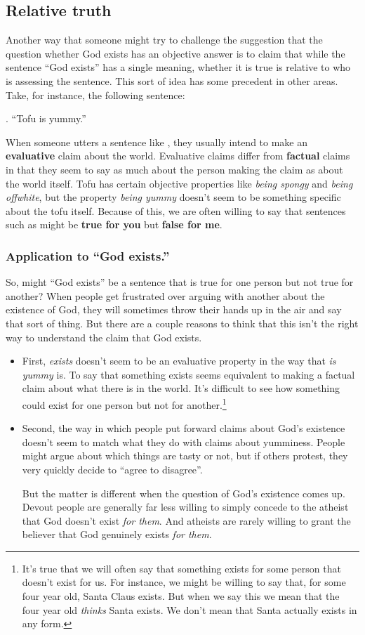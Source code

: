 \documentclass[letterpaper,10pt]{article}
\begin{document}
\subsection{Relative truth}
Another way that someone might try to challenge the suggestion that the question whether God exists has an objective answer is to claim that while the sentence ``God exists'' has a single meaning, whether it is true is relative to who is assessing the sentence.  This sort of idea has some precedent in other areas. Take, for instance, the following sentence:

\ex. ``Tofu is yummy.''

When someone utters a sentence like \Last, they usually intend to make an \textbf{evaluative} claim about the world.  Evaluative claims differ from \textbf{factual} claims in that they seem to say as much about the person making the claim as about the world itself.  Tofu has certain objective properties like \textit{being spongy} and \textit{being offwhite}, but the property \textit{being yummy} doesn't seem to be something specific about the tofu itself.  Because of this, we are often willing to say that sentences such as \Last might be \textbf{true for you} but \textbf{false for me}.

\subsubsection{Application to ``God exists.''}
So, might ``God exists'' be a sentence that is true for one person but not true for another?  When people get frustrated over arguing with another about the existence of God, they will sometimes throw their hands up in the air and say that sort of thing.  But there are a couple reasons to think that this isn't the right way to understand the claim that God exists.
\begin{itemize}
 \item First, \textit{exists} doesn't seem to be an evaluative property in the way that \textit{is yummy} is. To say that something exists seems equivalent to making a factual claim about what there is in the world. It's difficult to see how something could exist for one person but not for another.\footnote{It's true that we will often say that something exists for some person that doesn't exist for us.  For instance, we might be willing to say that, for some four year old, Santa Claus exists.  But when we say this we mean that the four year old \textit{thinks} Santa exists.  We don't mean that Santa actually exists in any form.}
 
 \item Second, the way in which people put forward claims about God's existence doesn't seem to match what they do with claims about yumminess.  People might argue about which things are tasty or not, but if others protest, they very quickly decide to ``agree to disagree''. 

 But the matter is different when the question of God's existence comes up.  Devout people are generally far less willing to simply concede to the atheist that God doesn't exist \textit{for them}.  And atheists are rarely willing to grant the believer that God genuinely exists \textit{for them}. 
\end{itemize}
\end{document}
